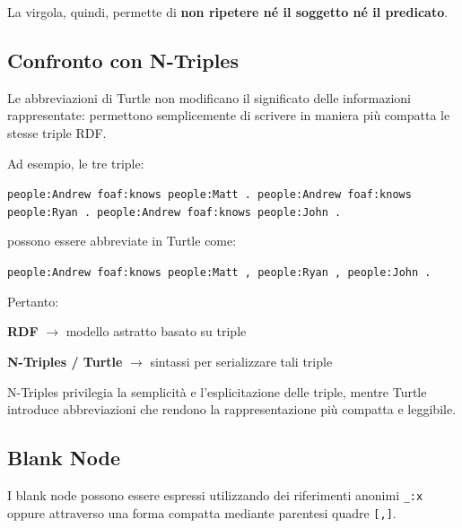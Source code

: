 La virgola, quindi, permette di \textbf{non ripetere né il soggetto né il predicato}.

\subsection*{Confronto con N-Triples}

Le abbreviazioni di Turtle non modificano il significato delle informazioni rappresentate: permettono semplicemente di scrivere in maniera più compatta le stesse triple RDF.

Ad esempio, le tre triple:

\begin{center}
\texttt{people:Andrew foaf:knows people:Matt .}\
\texttt{people:Andrew foaf:knows people:Ryan .}\
\texttt{people:Andrew foaf:knows people:John .}
\end{center}

possono essere abbreviate in Turtle come:

\begin{center}
\texttt{people:Andrew foaf:knows people:Matt , people:Ryan , people:John .}
\end{center}

Pertanto:

\begin{center}
\textbf{RDF} $\rightarrow$ modello astratto basato su triple
\end{center}

\begin{center}
\textbf{N-Triples / Turtle} $\rightarrow$ sintassi per serializzare tali triple
\end{center}

N-Triples privilegia la semplicità e l'esplicitazione delle triple, mentre Turtle introduce abbreviazioni che rendono la rappresentazione più compatta e leggibile.



\subsection{Blank Node}

I blank node possono essere espressi utilizzando dei riferimenti anonimi \texttt{\_:x} oppure attraverso una forma compatta mediante parentesi quadre \texttt{[,]}.

\vspace{1em}


